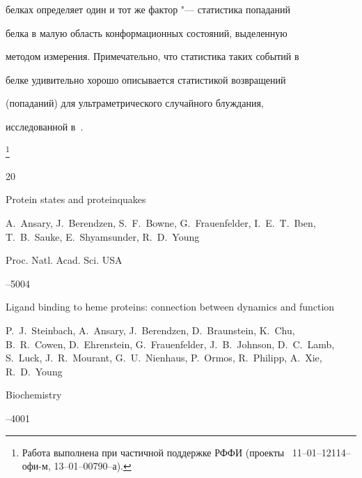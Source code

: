 белках определяет один и тот же фактор "--- статистика попаданий

белка в малую область конформационных состояний, выделенную

методом измерения. Примечательно, что статистика таких событий в

белке удивительно хорошо описывается статистикой возвращений

(попаданий) для ультраметрического случайного блуждания,

исследованной  в~\cite{avetisov_bikulov_zubarev:bib:ABZ}.



{\thanks{Работа выполнена при частичной поддержке РФФИ (проекты  \No\No~11--01--12114--офи-м, 13--01--00790--а).}





\def\refname{БИБЛИОГРАФИЧЕСКИЙ СПИСОК}



\begin{thebibliography}{20}






\paper Protein states and proteinquakes

\by  A.~Ansary, J.~Berendzen, S.~F.~Bowne, G.~Frauenfelder, I.~E.~T.~Iben, T.~B.~Sauke, E.~Shyamsunder, R.~D.~Young

\jour Proc. Natl. Acad. Sci. USA




--5004






\paper Ligand  binding to heme proteins: connection between dynamics and function 

\by P.~J.~Steinbach, A.~Ansary, J.~Berendzen, D.~Braunstein, K.~Chu, B.~R.~Cowen, D.~Ehrenstein, G.~Frauenfelder, J.~B.~Johnson, D.~C.~Lamb, S.~Luck, J.~R.~Mourant, G.~U.~Nienhaus, P.~Ormos, R.~Philipp, A.~Xie, R.~D.~Young

\jour Biochemistry




--4001






\end{thebibliography}}
